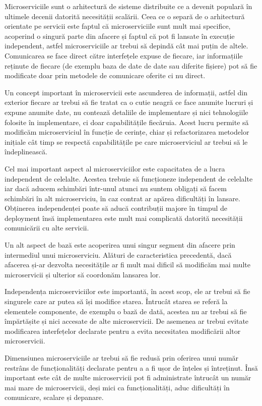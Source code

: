 Microserviciile sunt o arhitectură de sisteme distribuite ce a devenit populară în ultimele decenii datorită
necesității scalării. Ceea ce o separă de o arhitectură orientate pe servicii este faptul că microserviciile
sunt mult mai specifice, acoperind o singură parte din afacere și faptul că pot fi lansate în execuție independent,
astfel microserviciile ar trebui să depindă cât mai puțin de altele. Comunicarea se face direct către interfețele
expuse de fiecare, iar informațiile reținute de fiecare (de exemplu baza de date de date sau diferite fișiere)
pot să fie modificate doar prin metodele de comunicare oferite ci nu direct.

Un concept important în microservicii este ascunderea de informații, astfel din exterior fiecare ar trebui să 
fie tratat ca o cutie neagră ce face anumite lucruri și expune anumite date, nu contează detaliile de implementare
și nici tehnologiile folosite în implementare, ci doar capabilitățile fiecăruia. Acest lucru permite să modificăm
microserviciul în funcție de cerințe, chiar și refactorizarea metodelor inițiale cât timp se respectă 
capabilitățile pe care microserviciul ar trebui să le îndeplinească.

Cel mai important aspect al microserviciilor este capacitatea de a lucra independent de celelalte. Acestea
trebuie să funcționeze independent de celelalte iar dacă aducem schimbări într-unul atunci nu suntem obligați să
facem schimbări în alt microserviciu, în caz contrat ar apărea dificultăți în lansare. Obținerea independenței poate
să aducă contribuții majore în timpul de deployment însă implementarea este mult mai complicată datorită necesității
comunicării cu alte servicii.

Un alt aspect de bază este acoperirea unui singur segment din afacere prin intermediul unui microserviciu. Alături 
de caracteristica precedentă, dacă afacerea și-ar dezvolta necesitățile ar fi mult mai dificil să modificăm
mai multe microservicii și ulterior să coordonăm lansarea lor.

Independența microserviciilor este importantă, în acest scop, ele ar trebui să fie singurele care ar putea să își modifice starea.
Întrucât starea se referă la elementele componente, de exemplu o bază de dată, acestea nu ar trebui să fie împărtășite
și nici accesate de alte microservicii. De asemenea ar trebui evitate modificarea interfețelor declarate pentru
a evita necesitatea modificării altor microservicii.

Dimensiunea microserviciile ar trebui să fie redusă prin oferirea unui număr restrâns de funcționalități declarate pentru a
a fi ușor de înțeles și întreținut. Însă important este cât de multe microservicii
pot fi administrate întrucât un număr mai mare de microservicii, deși mici ca funcționalități, aduc dificultăți
în comunicare, scalare și depanare.

